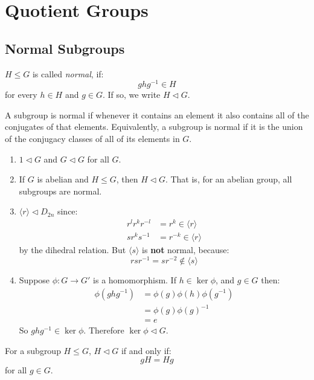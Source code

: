 \documentclass[../main.tex]{subfiles}
\begin{document}
\chapter{Quotient Groups}
\section{Normal Subgroups}
\begin{definition}
  $H \leq G$ is called \textit{normal}, if:
  \[
    ghg^{-1} \in H
  \]
  for every $h \in H$ and $g \in G$.
  If so, we write $H \lhd G$.
\end{definition}
\begin{remark}[Intuition]
  A subgroup is normal if whenever it contains an element it also contains all of the conjugates of that elements.
  Equivalently, a subgroup is normal if it is the union of the conjugacy classes of all of its elements in $G$.
\end{remark}
\begin{example}
  \begin{enumerate}
    \item $1 \lhd G$ and $G \lhd G$ for all $G$.
    \item If $G$ is abelian and $H \leq G$, then $H \lhd G$.
      That is, for an abelian group, all subgroups are normal.
    \item $\langle r \rangle \lhd D_{2n}$ since:
      \begin{align*}
        r^{l}r^{k}r^{-l} &= r^{k} \in \langle r \rangle \\
        sr^{k}s^{-1} &= r^{-k} \in \langle r \rangle
      \end{align*}
      by the dihedral relation.
      But $\langle s \rangle$ is \textbf{not} normal, because:
      \[
        rsr^{-1} = sr^{-2} \notin \langle s \rangle
      \]
    \item Suppose $\phi: G \to G'$ is a homomorphism.
      If $h \in \ker \phi$, and $g \in G$ then:
      \begin{align*}
        \phi(ghg^{-1}) &= \phi(g)\phi(h)\phi(g^{-1}) \\
                       &= \phi(g)\phi(g)^{-1} \\
                       &= e
      \end{align*}
      So $ghg^{-1} \in \ker \phi$.
      Therefore $\ker \phi \lhd G$.
  \end{enumerate}
\end{example}
\begin{lemma}
  For a subgroup $H \leq G$, $H \lhd G$ if and only if: \label{quotientCosets}
  \[
    gH = Hg
  \]
  for all $g \in G$.
\end{lemma}
\end{document}
